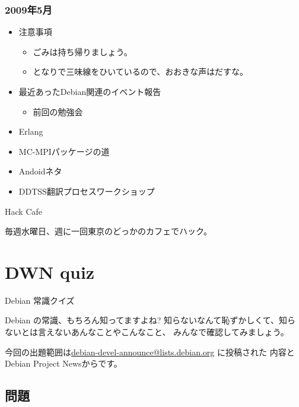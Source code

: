 \begin{frame}
 \frametitle{2009年5月}
\begin{minipage}[t]{0.45\hsize}
  \begin{itemize}
  \item 注意事項
	\begin{itemize}
	 \item ごみは持ち帰りましょう。
	 \item となりで三味線をひいているので、おおきな声はだすな。
	\end{itemize}
  \item 最近あったDebian関連のイベント報告
	\begin{itemize}
	 \item 前回の勉強会
	\end{itemize}
 \end{itemize}
\end{minipage} 
\begin{minipage}[t]{0.45\hsize}
 \begin{itemize}
  \item Erlang
  \item MC-MPIパッケージの道
  \item Andoidネタ
  \item DDTSS翻訳プロセスワークショップ
 \end{itemize}
\end{minipage}
\end{frame}

\begin{frame}{Hack Cafe}

毎週水曜日、週に一回東京のどっかのカフェでハック。

\end{frame}

\section{DWN quiz}
\begin{frame}{Debian 常識クイズ}

Debian の常識、もちろん知ってますよね?
知らないなんて恥ずかしくて、知らないとは言えないあんなことやこんなこと、
みんなで確認してみましょう。

今回の出題範囲は\url{debian-devel-announce@lists.debian.org} に投稿された
内容とDebian Project Newsからです。

\end{frame}

\subsection{問題}


